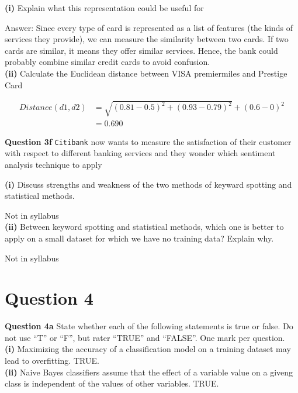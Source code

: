\documentclass[11pt,a4paper]{report}
\begin{document}
\begin{multicols*}{2}
\noindent \textbf{(i)} Explain what this representation could be useful for

\noindent Answer: Since every type of card is represented as a list of features (the kinds of services they provide), we can measure the similarity between two cards. If two cards are similar, it means they offer similar services. Hence, the bank could probably combine similar credit cards to avoid confusion. \\

\noindent \textbf{(ii)} Calculate the Euclidean distance between VISA premiermiles and Prestige Card

\begin{equation*}
\begin{split}
    Distance(d1,d2) &= \sqrt{(0.81 - 0.5)^2 + (0.93 - 0.79)^2} + (0.6 - 0)^2\\
    &= 0.690
\end{split}
\end{equation*}

\noindent \textbf{Question 3f} \verb|Citibank| now wants to measure the satisfaction of their customer with respect to different banking services and they wonder which sentiment analysis technique to apply

\noindent \textbf{(i)} Discuss strengths and weakness of the two methods of keyward spotting and statistical methods. 

\noindent Not in syllabus\\

\noindent \textbf{(ii)} Between keyword spotting and statistical methods, which one is better to apply on a small dataset for which we have no training data? Explain why.

\noindent Not in syllabus

\section{Question 4}

\noindent \textbf{Question 4a} State whether each of the following statements is true or false. Do not use ``T'' or ``F'', but rater ``TRUE'' and ``FALSE''. One mark per question.\\

\noindent \textbf{(i)} Maximizing the accuracy of a classification model on a training dataset may lead to overfitting. TRUE.\\

\noindent \textbf{(ii)} Naive Bayes classifiers assume that the effect of a variable value on a giveng class is independent of the values of other variables. TRUE.\\


\end{multicols*}
\end{document}
